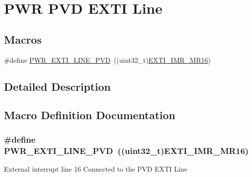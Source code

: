 \hypertarget{group___p_w_r___p_v_d___e_x_t_i___line}{}\section{P\+WR P\+VD E\+X\+TI Line}
\label{group___p_w_r___p_v_d___e_x_t_i___line}
\subsection*{Macros}
\begin{DoxyCompactItemize}
\item 
\#define \hyperlink{group___p_w_r___p_v_d___e_x_t_i___line_ga43a49255649e03d2d2b6b12c5c379d2b}{P\+W\+R\+\_\+\+E\+X\+T\+I\+\_\+\+L\+I\+N\+E\+\_\+\+P\+VD}~((uint32\+\_\+t)\hyperlink{group___peripheral___registers___bits___definition_ga7419f78ed9044bdd237b452ef49e1b7f}{E\+X\+T\+I\+\_\+\+I\+M\+R\+\_\+\+M\+R16})
\end{DoxyCompactItemize}


\subsection{Detailed Description}


\subsection{Macro Definition Documentation}
\subsubsection[{\texorpdfstring{P\+W\+R\+\_\+\+E\+X\+T\+I\+\_\+\+L\+I\+N\+E\+\_\+\+P\+VD}{PWR_EXTI_LINE_PVD}}]{\setlength{\rightskip}{0pt plus 5cm}\#define P\+W\+R\+\_\+\+E\+X\+T\+I\+\_\+\+L\+I\+N\+E\+\_\+\+P\+VD~((uint32\+\_\+t){\bf E\+X\+T\+I\+\_\+\+I\+M\+R\+\_\+\+M\+R16})}\hypertarget{group___p_w_r___p_v_d___e_x_t_i___line_ga43a49255649e03d2d2b6b12c5c379d2b}{}\label{group___p_w_r___p_v_d___e_x_t_i___line_ga43a49255649e03d2d2b6b12c5c379d2b}
External interrupt line 16 Connected to the P\+VD E\+X\+TI Line 